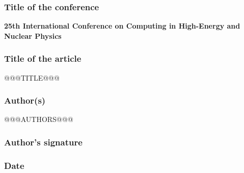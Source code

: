 \documentclass[a4paper,10pt]{article}
\begin{document}
\subsubsection*{Title of the conference}

\textbf{25th International Conference on Computing in High-Energy and Nuclear Physics}


\subsubsection*{Title of the article}

@@@TITLE@@@
\vspace{5mm}

\subsubsection*{Author(s)}

@@@AUTHORS@@@
\vspace{5mm}

\subsubsection*{Author’s signature}

\vspace{15mm}

\subsubsection*{Date}

\vspace{15mm}
\end{document}
